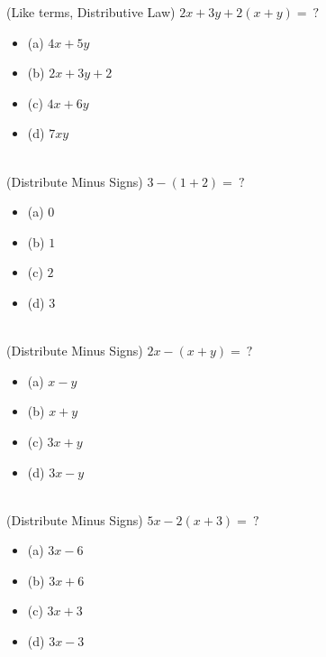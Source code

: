 \documentclass{article}
\begin{document}
(Like terms, Distributive Law) $2x + 3y + 2(x+y) = \ ?$
\begin{itemize}
    \item[](a) $4x + 5y$
    \item[](b) $2x + 3y + 2$
    \item[](c) $4x + 6y$
    \item[](d) $7xy$
\end{itemize} \hrulefill \\[10pt]
(Distribute Minus Signs) $3-(1+2) = \ ?$
\begin{itemize}
\item[] (a) $0$
\item[] (b) $1$
\item[] (c) $2$
\item[] (d) $3$
\end{itemize} \hrulefill \\[10pt]
(Distribute Minus Signs) $2x - (x+y) = \ ?$
\begin{itemize}
\item[](a) $x-y$
\item[](b) $x+y$
\item[](c) $3x+y$
\item[](d) $3x-y$
\end{itemize} \hrulefill \\[10pt]
(Distribute Minus Signs) $5x - 2(x+3) = \ ?$
\begin{itemize}
\item[] (a) $3x-6$
\item[] (b) $3x+6$
\item[] (c) $3x+3$
\item[] (d) $3x-3$
\end{itemize} \hrulefill \\[10pt]
\end{document}
